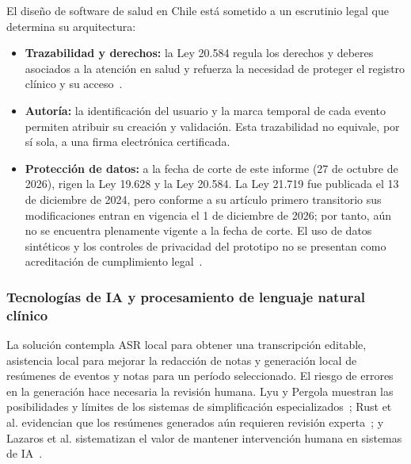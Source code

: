 El diseño de software de salud en Chile está sometido a un escrutinio legal que determina su arquitectura:

\begin{itemize}
    \item \textbf{Trazabilidad y derechos:} la Ley 20.584 regula los derechos y deberes asociados a la atención en salud y refuerza la necesidad de proteger el registro clínico y su acceso~\cite{ley_20584_derechos_paciente}.

    \item \textbf{Autoría:} la identificación del usuario y la marca temporal de cada evento permiten atribuir su creación y validación. Esta trazabilidad no equivale, por sí sola, a una firma electrónica certificada.

    \item \textbf{Protección de datos:} a la fecha de corte de este informe (27 de octubre de 2026), rigen la Ley 19.628 y la Ley 20.584. La Ley 21.719 fue publicada el 13 de diciembre de 2024, pero conforme a su artículo primero transitorio sus modificaciones entran en vigencia el 1 de diciembre de 2026; por tanto, aún no se encuentra plenamente vigente a la fecha de corte. El uso de datos sintéticos y los controles de privacidad del prototipo no se presentan como acreditación de cumplimiento legal~\cite{ley_19628_vida_privada,ley_20584_derechos_paciente,ley_21719_datos_personales}.
\end{itemize}

\subsubsection{Tecnologías de IA y procesamiento de lenguaje natural clínico}

La solución contempla ASR local para obtener una transcripción editable, asistencia local para mejorar la redacción de notas y generación local de resúmenes de eventos y notas para un período seleccionado. El riesgo de errores en la generación hace necesaria la revisión humana. Lyu y Pergola muestran las posibilidades y límites de los sistemas de simplificación especializados~\cite{lyu2024}; Rust et al. evidencian que los resúmenes generados aún requieren revisión experta~\cite{rust2025}; y Lazaros et al. sistematizan el valor de mantener intervención humana en sistemas de IA~\cite{lazaros2026}.
